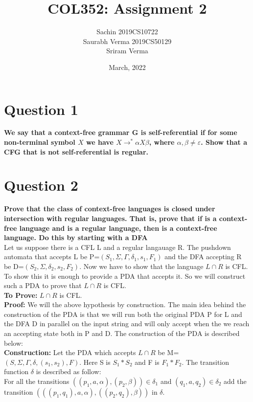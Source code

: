 \documentclass{article}
\title{COL352: Assignment 2}
\author{Sachin 2019CS10722 \\
        Saurabh Verma 2019CS50129\\
        Sriram Verma}
\date{March, 2022}
\begin{document}
\maketitle


\section{Question 1}
\textbf{We say that a context-free grammar G is self-referential if for some non-terminal symbol $X$ we have $X \to^* \alpha X \beta$, where $\alpha, \beta \neq \varepsilon$. Show that a CFG that is not self-referential is regular.}



\pagebreak

\section{Question 2}
\textbf{Prove that the class of context-free languages is closed under intersection with regular languages. That is, prove that if  is a context-free language and  is a regular language, then 
is a context-free language. Do this by starting with a DFA}\\
\newline
Let us suppose there is a CFL L and a regular langauage R. The pushdown automata that accepts L be P=$(S_1,\Sigma,\Gamma,\delta_1,s_1,F_1)$ and the DFA accepting R be D=$(S_2,\Sigma,\delta_2,s_2,F_2)$. Now we have to show that the language $L\cap R$ is CFL. To show this it is enough to provide a PDA that accepts it. So we will construct such a PDA to prove that  $L\cap R$ is CFL. \\
\textbf{To Prove:} $L\cap R$ is CFL. \\
\textbf{Proof:} We will the above hypothesis by construction. The main idea behind the construction of the PDA is that we will run both the original PDA P for L and the DFA D in parallel on the input string and will only accept when the we reach an accepting state both in P and D. The construction of the PDA is described below:\\
\textbf{Construction:} Let the PDA which accepts $L\cap R$ be M=$(S,\Sigma,\Gamma,\delta,(s_1,s_2),F)$. Here S is $S_1 * S_2$ and F is $F_1 *F_2$. The transition function $\delta$ is described as follow: \\
For all the transitions $((p_1,a,\alpha),(p_2,\beta)) \in \delta_1$  and $(q_1,a,q_2) \in \delta_2$ add the transition $(((p_1,q_1),a,\alpha),((p_2,q_2),\beta))$ in $\delta$.\\
\end{document}
